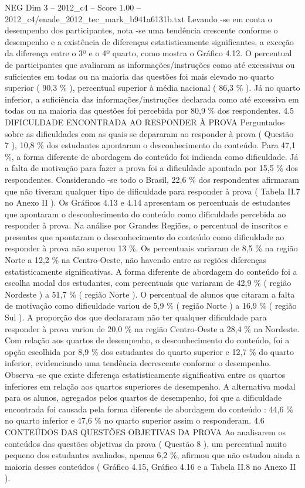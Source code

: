 \begin{textsample}{NEG Dim 3 – 2012\_c4 – Score 1.00 – 2012\_c4/enade\_2012\_tec\_mark\_b941a6131b.txt}
Levando -se em conta o desempenho dos participantes, nota -se uma tendência crescente conforme o desempenho e a existência de diferenças estatisticamente significantes, a exceção da diferença entre o 3º e o 4º quarto, como mostra o Gráfico 4.12.
O percentual de participantes que avaliaram as informações/instruções como até excessivas ou suficientes em todas ou na maioria das questões foi mais elevado no quarto superior ( 90,3 \% ), percentual superior à média nacional ( 86,3 \% ).
Já no quarto inferior, a suficiência das informações/instruções declarada como até excessiva em todas ou na maioria das questões foi percebida por 80,9 \% dos respondentes. 4.5 DIFICULDADE ENCONTRADA AO RESPONDER À PROVA Perguntados sobre as dificuldades com as quais se depararam ao responder à prova ( Questão 7 ), 10,8 \% dos estudantes apontaram o desconhecimento do conteúdo.
Para 47,1 \%, a forma diferente de abordagem do conteúdo foi indicada como dificuldade.
Já a falta de motivação para fazer a prova foi a dificuldade apontada por 15,5 \% dos respondentes.
Considerando -se todo o Brasil, 22,6 \% dos respondentes afirmaram que não tiveram qualquer tipo de dificuldade para responder à prova ( Tabela II.7 no Anexo II ).
Os Gráficos 4.13 e 4.14 apresentam os percentuais de estudantes que apontaram o desconhecimento do conteúdo como dificuldade percebida ao responder à prova.
Na análise por Grandes Regiões, o percentual de inscritos e presentes que apontaram o desconhecimento do conteúdo como dificuldade ao responder à prova não superou 13 \%.
Os percentuais variaram de 8,5 \% na região Norte a 12,2 \% na Centro-Oeste, não havendo entre as regiões diferenças estatisticamente significativas.
A forma diferente de abordagem do conteúdo foi a escolha modal dos estudantes, com percentuais que variaram de 42,9 \% ( região Nordeste ) a 51,7 \% ( região Norte ).
O percentual de alunos que citaram a falta de motivação como dificuldade variou de 5,9 \% ( região Norte ) a 16,9 \% ( região Sul ).
A proporção dos que declararam não ter qualquer dificuldade para responder à prova variou de 20,0 \% na região Centro-Oeste a 28,4 \% na Nordeste.
Com relação aos quartos de desempenho, o desconhecimento do conteúdo, foi a opção escolhida por 8,9 \% dos estudantes do quarto superior e 12,7 \% do quarto inferior, evidenciando uma tendência decrescente conforme o desempenho.
Observa -se que existe diferença estatisticamente significativa entre os quartos inferiores em relação aos quartos superiores de desempenho.
A alternativa modal para os alunos, agregados pelos quartos de desempenho, foi que a dificuldade encontrada foi causada pela forma diferente de abordagem do conteúdo : 44,6 \% no quarto inferior e 47,6 \% no quarto superior assim o responderam. 4.6 CONTEÚDOS DAS QUESTÕES OBJETIVAS DA PROVA Ao analisarem os conteúdos das questões objetivas da prova ( Questão 8 ), um percentual muito pequeno dos estudantes avaliados, apenas 6,2 \%, afirmou que não estudou ainda a maioria desses conteúdos ( Gráfico 4.15, Gráfico 4.16 e a Tabela II.8 no Anexo II ).

\end{textsample}
